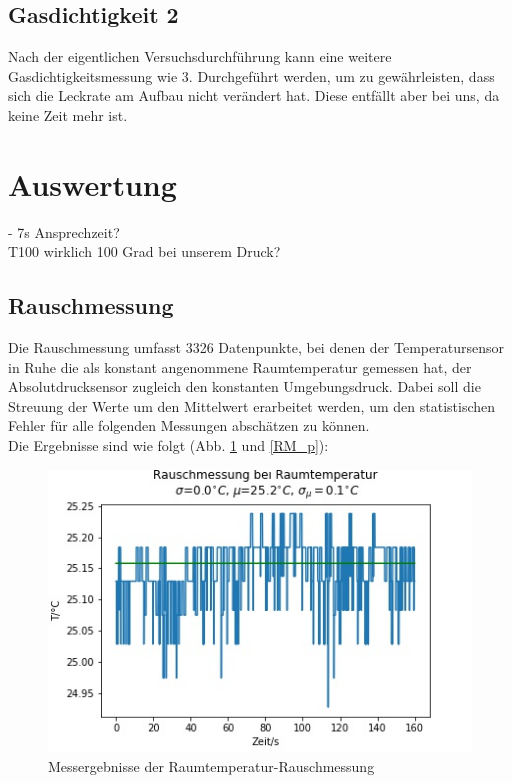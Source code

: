 \documentclass[]{article}
\begin{document}
\subsection{Gasdichtigkeit 2}

Nach der eigentlichen Versuchsdurchführung kann eine weitere Gasdichtigkeitsmessung wie 3. Durchgeführt werden, um zu gewährleisten, dass sich die Leckrate am Aufbau nicht verändert hat. Diese entfällt aber bei uns, da keine Zeit mehr ist.

\section{Auswertung}
{\color{red}- 7s Ansprechzeit?}\\
{\color{red}T100 wirklich 100 Grad bei unserem Druck?}\\
\subsection{Rauschmessung}
Die Rauschmessung umfasst 3326 Datenpunkte, bei denen der Temperatursensor in Ruhe die als konstant angenommene Raumtemperatur gemessen hat, der Absolutdrucksensor zugleich den konstanten Umgebungsdruck. Dabei soll die Streuung der Werte um den Mittelwert erarbeitet werden, um den statistischen Fehler für alle folgenden Messungen abschätzen zu können.\\
Die Ergebnisse sind wie folgt (Abb. \ref{RM_T} und \ref{RM_p}):\\
\begin{figure}[h]
	\begin{center}
		\includegraphics[scale=0.9]{Images/RauschmessungRT_T.jpg}
		\caption{Messergebnisse der Raumtemperatur-Rauschmessung}
		\label{RM_T}
	\end{center}
\end{figure}\\
\end{document}
